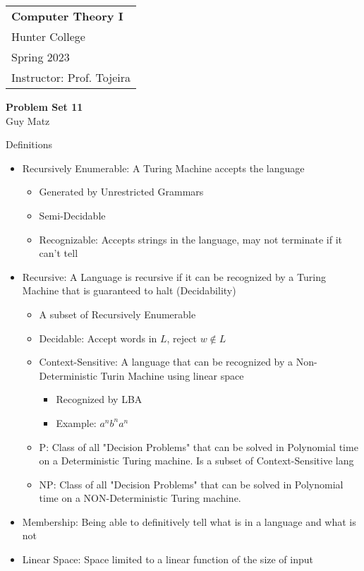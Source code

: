 \documentclass[12pt]{scrbook}
\author{Guy Matz}
\begin{document}
  \begin{tabular}{p{15.5cm}}
    {\large \textbf{Computer Theory I}} \\
    Hunter College \\
    Spring 2023  \\
    Instructor: Prof. Tojeira\\
    \hline
  \end{tabular}
  \begin{center}
    {\Large \textbf{Problem Set 11}}
    \vspace{2mm}\\
    Guy Matz
  \end{center}

  Definitions
  \begin{itemize}
    \item Recursively Enumerable: A Turing Machine accepts the language
      \begin{itemize}
        \item Generated by Unrestricted Grammars
        \item Semi-Decidable
        \item Recognizable: Accepts strings in the language, may not
          terminate if it can't tell
      \end{itemize}
      \item Recursive: A Language is recursive if it can be recognized by a
        Turing Machine that is guaranteed to halt (Decidability)
      \begin{itemize}
        \item A subset of Recursively Enumerable
        \item Decidable: Accept words in $L$, reject $w \notin L$
      \end{itemize}
    \begin{itemize}
      \item Context-Sensitive: A language that can be recognized by a Non-Deterministic Turin Machine
        using linear space
      \begin{itemize}
        \item Recognized by LBA
        \item Example: $a^nb^na^n$
      \end{itemize}
      \item P: Class of all "Decision Problems" that can be solved in Polynomial time
        on a Deterministic Turing machine.  Is a subset of Context-Sensitive lang
      \item NP: Class of all "Decision Problems" that can be solved in Polynomial time
        on a NON-Deterministic Turing machine.
    \end{itemize}
    \item Membership: Being able to definitively tell what is in a language
      and what is not
    \item Linear Space: Space limited to a linear function of the size of input

  \end{itemize}
\end{document}
